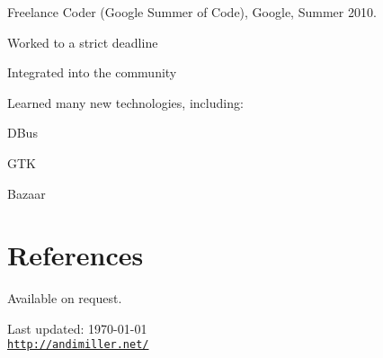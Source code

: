 \documentclass[a4paper]{article}
\def\footerlink{http://andimiller.net/}
\renewenvironment{itemize}{
  \begin{list}{}{
    \setlength{\leftmargin}{1.5em}
  }
}{
  \end{list}
}
\newenvironment{packed}{
\begin{itemize}
  \setlength{\itemsep}{0pt}
  \setlength{\parskip}{0pt}
  \setlength{\parsep}{0pt}
}{\end{itemize}}
\begin{document}
\begin{itemize}
\item Freelance Coder (Google Summer of Code), Google, Summer 2010.
	\begin{packed}
	\item Worked to a strict deadline
	\item Integrated into the community
	\item Learned many new technologies, including:
		\begin{packed}
		\item DBus
		\item GTK
		\item Bazaar
		\end{packed}
	\end{packed}
\end{itemize}
%
%

\section*{References}
Available on request.

\vfill

\begin{center}
  \begin{footnotesize}
    Last updated: \today \\
    \href{\footerlink}{\texttt{\footerlink}}
  \end{footnotesize}
\end{center}
\end{document}
